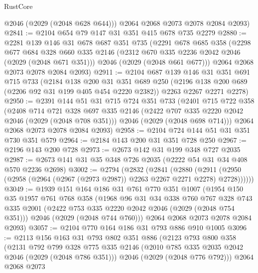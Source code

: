 \begin{lexlean}{RustCore}
\begin{coremodule}
        @2046
        (@2029 (@2048 @628 @644)))
      @2064
      @2068
      @2073
      @2078
      @2084
      @2093)
@2841 := @2104 @654 @79 @147 @31 @351 @415 @678 @735 @2279
@2880 := @2281
    @139
    @146
    @31
    @678
    @687
    @351
    @735
    (@2291
      @678
      @685
      @358
      (@2298
        @677
        @684
        @328
        @660
        @335
        @2146
        (@2312 @670 @335 @2236 @2042 @2046 (@2029 (@2048 @671 @351)))
        @2046
        (@2029 (@2048 @661 @677)))
      @2064
      @2068
      @2073
      @2078
      @2084
      @2093)
@2911 := @2104
    @687
    @139
    @146
    @31
    @351
    @691
    @715
    @733
    (@2184
      @138
      @200
      @31
      @351
      @689
      @250
      (@2196 @138 @200 @689 (@2206 @92 @31 @199 @405 @454 @2220 @2382))
      @2263
      @2267
      @2271
      @2278)
@2950 := @2391
    @144
    @51
    @31
    @715
    @724
    @351
    @733
    (@2401
      @715
      @722
      @358
      (@2408
        @714
        @721
        @328
        @697
        @335
        @2146
        (@2422 @707 @335 @2220 @2042 @2046 (@2029 (@2048 @708 @351)))
        @2046
        (@2029 (@2048 @698 @714)))
      @2064
      @2068
      @2073
      @2078
      @2084
      @2093)
@2958 := @2104 @724 @144 @51 @31 @351 @730 @351 @579
@2964 := @2184 @143 @200 @31 @351 @728 @250
@2967 := @2196 @143 @200 @728
@2973 := @2673 @142 @31 @199 @348 @727 @2035
@2987 := @2673 @141 @31 @35 @348 @726 @2035 (@2222 @54 @31 @34 @408 @570 @2236 @2698)
@3002 := @2794
    (@2832
      (@2841
        (@2880
          (@2911 (@2950 (@2958 (@2964 (@2967 (@2973 @2987)) @2263 @2267 @2271 @2278) @2728))))))
@3049 := @1939
    @151
    @164
    @186
    @31
    @761
    @770
    @351
    @1007
    (@1954
      @150
      @35
      @1957
      @761
      @768
      @358
      (@1968
        @96
        @31
        @34
        @338
        @760
        @767
        @328
        @743
        @335
        @2001
        (@2422 @753 @335 @2220 @2042 @2046 (@2029 (@2048 @754 @351)))
        @2046
        (@2029 (@2048 @744 @760)))
      @2064
      @2068
      @2073
      @2078
      @2084
      @2093)
@3057 := @2104 @770 @164 @186 @31 @793 @886 @910 @1005
@3096 := @2113
    @156
    @163
    @31
    @793
    @802
    @351
    @886
    (@2123
      @793
      @800
      @358
      (@2131
        @792
        @799
        @328
        @775
        @335
        @2146
        (@2010 @785 @335 @2035 @2042 @2046 (@2029 (@2048 @786 @351)))
        @2046
        (@2029 (@2048 @776 @792)))
      @2064
      @2068
      @2073

\end{coremodule}
\end{lexlean}
